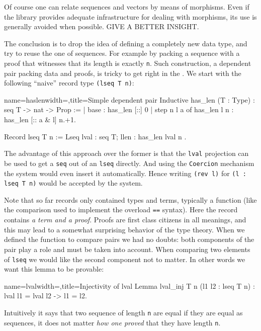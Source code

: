 Of course one can relate sequences and vectors by means of
morphisms.  Even if the \mcbMC{} library provides adequate
infrastructure for dealing with morphisms, its use is generally
avoided when possible.  GIVE A BETTER INSIGHT.

The conclusion is to drop the idea of defining a completely new data
type, and try to reuse the one of sequences.  For example by packing a
sequence with a proof that witnesses that its length is exactly
\lstinline/n/.  Such construction, a dependent pair packing data
and proofs, is tricky to get right in the \mcbCIC{}.  We start with
the following ``naive'' record type \lstinline/(lseq T n)/:

\begin{coq}{name=haslen}{width=\textwidth,title=Simple dependent pair}
Inductive has_len (T : Type) : seq T -> nat -> Prop :=
| base : has_len [::] 0
| step n l a of has_len l n : has_len [:: a & l] n.+1.

Record lseq T n := Lseq { lval : seq T; llen : has_len lval n }.
\end{coq}

The advantage of this approach over the former is that the
\lstinline/lval/ projection can be used to get a \lstinline/seq/ out
of an \lstinline/lseq/ directly.  And using the \lstinline/Coercion/
mechanism the system would even insert it automatically.  Hence
writing \lstinline/(rev l)/ for \lstinline/(l : lseq T n)/ would
be accepted by the system.

Note that so far records only contained types and terms, typically
a function (like the comparison used to implement the overload
\lstinline/==/ syntax).  Here the record contains \emph{a term and a proof}.
Proofs are first class citizens in all meanings, and this may lead to
a somewhat surprising behavior of the type theory.
When we defined the function to compare pairs we had no
doubts: both components of the pair play a role and must be taken into
account.  When comparing two elements of \lstinline/lseq/ we would
like the second component not to matter.  In other words we want this
lemma to be provable:

\begin{coq}{name=lval}{width=\textwidth,title=Injectivity of lval}
Lemma lval_inj T n (l1 l2 : lseq T n) : lval l1 = lval l2 -> l1 = l2.
\end{coq}

Intuitively it says that two sequence of length \lstinline/n/ are
equal if they are equal as sequences, it does not matter \emph{how one
proved} that they have length \lstinline/n/.

